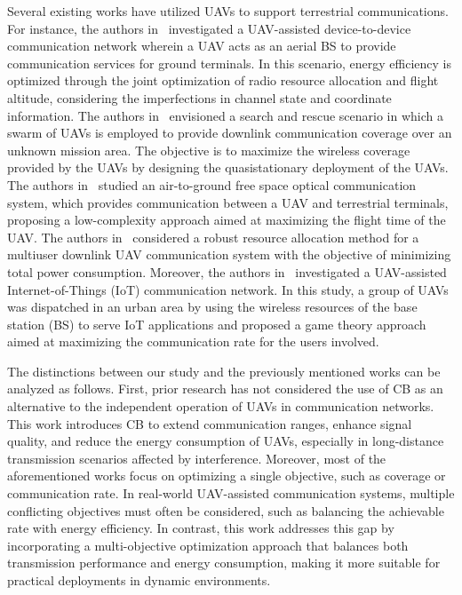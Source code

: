 \documentclass[10pt,journal,compsoc]{IEEEtran}
\begin{document}
\par Several existing works have utilized UAVs to support terrestrial communications. For instance, the authors in~\cite{xu2021robust} investigated a UAV-assisted device-to-device communication network wherein a UAV acts as an aerial BS to provide communication services for ground terminals. In this scenario, energy efficiency is optimized through the joint optimization of radio resource allocation and flight altitude, considering the imperfections in channel state and coordinate information. The authors in~\cite{Gao2022coverage} envisioned a search and rescue scenario in which a swarm of UAVs is employed to provide downlink communication coverage over an unknown mission area. The objective is to maximize the wireless coverage provided by the UAVs by designing the quasistationary deployment of the UAVs. The authors in~\cite{Lee2020aUAV-Mounted} studied an air-to-ground free space optical communication system, which provides communication between a UAV and terrestrial terminals, proposing a low-complexity approach aimed at maximizing the flight time of the UAV. The authors in~\cite{Xu2020multiuser} considered a robust resource allocation method for a multiuser downlink UAV communication system with the objective of minimizing total power consumption. Moreover, the authors in~\cite{Yan2019agametheory} investigated a UAV-assisted Internet-of-Things (IoT) communication network. In this study, a group of UAVs was dispatched in an urban area by using the wireless resources of the base station (BS) to serve IoT applications and proposed a game theory approach aimed at maximizing the communication rate for the users involved.

\par The distinctions between our study and the previously mentioned works can be analyzed as follows. First, prior research has not considered the use of CB as an alternative to the independent operation of UAVs in communication networks. This work introduces CB to extend communication ranges, enhance signal quality, and reduce the energy consumption of UAVs, especially in long-distance transmission scenarios affected by interference. Moreover, most of the aforementioned works focus on optimizing a single objective, such as coverage or communication rate. In real-world UAV-assisted communication systems, multiple conflicting objectives must often be considered, such as balancing the achievable rate with energy efficiency. In contrast, this work addresses this gap by incorporating a multi-objective optimization approach that balances both transmission performance and energy consumption, making it more suitable for practical deployments in dynamic environments.
\end{document}
